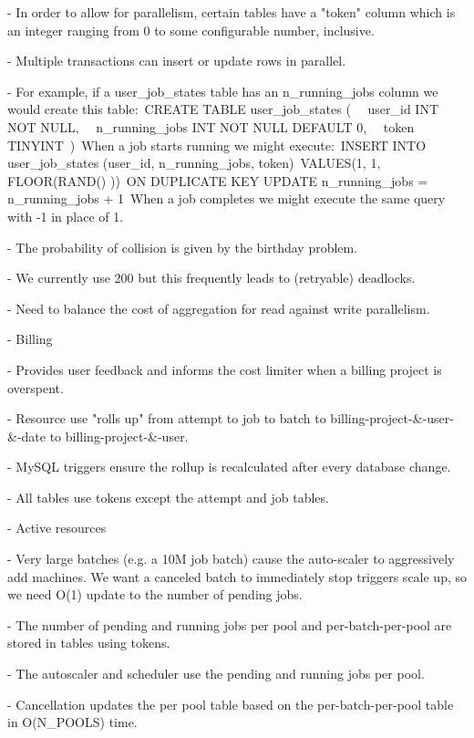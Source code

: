 \documentclass[10pt,a4paper%
]{article}
\begin{document}
      - In order to allow for parallelism, certain tables have a "token" column which is an integer ranging from 0 to some configurable number, inclusive.

      - Multiple transactions can insert or update rows in parallel.

      - For example, if a user\_job\_states table has an n\_running\_jobs column we would create this table:\
        CREATE TABLE user\_job\_states (\
          user\_id INT NOT NULL,\
          n\_running\_jobs INT NOT NULL DEFAULT 0,\
          token TINYINT\
        )\
        When a job starts running we might execute:\
        INSERT INTO user\_job\_states (user\_id, n\_running\_jobs, token)\
        VALUES(1, 1, FLOOR(RAND() ))\
        ON DUPLICATE KEY UPDATE n\_running\_jobs = n\_running\_jobs + 1\
        When a job completes we might execute the same query with -1 in place of 1.

      - The probability of collision is given by the birthday problem.

      - We currently use 200 but this frequently leads to (retryable) deadlocks.

      - Need to balance the cost of aggregation for read against write parallelism.

    - Billing

      - Provides user feedback and informs the cost limiter when a billing project is overspent.

      - Resource use "rolls up" from attempt to job to batch to billing-project-\&-user-\&-date to billing-project-\&-user.

      - MySQL triggers ensure the rollup is recalculated after every database change.

      - All tables use tokens except the attempt and job tables.

    - Active resources

      - Very large batches (e.g. a 10M job batch) cause the auto-scaler to aggressively add machines. We want a canceled batch to immediately stop triggers scale up, so we need O(1) update to the number of pending jobs.

      - The number of pending and running jobs per pool and per-batch-per-pool are stored in tables using tokens.

      - The autoscaler and scheduler use the pending and running jobs per pool.

      - Cancellation updates the per pool table based on the per-batch-per-pool table in O(N\_POOLS) time.
\end{document}
